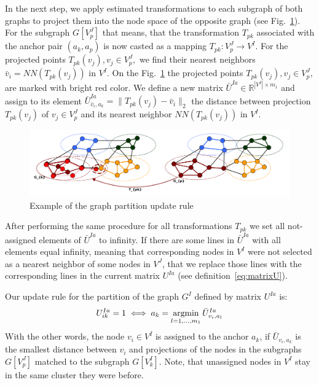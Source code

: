 In the next step, we apply estimated transformations to each subgraph of both graphs to project them into the node space of the opposite graph (see Fig.~\ref{fig:update}). For the subgraph $G[V^J_p]$ that means, that the transformation $T_{pk}$ associated with the anchor pair $(a_k,a_p)$ is now casted as a mapping $T_{pk}:V^J_p\rightarrow V^I$. For the projected points $T_{pk}(v_j),v_j\in V^J_p,$ we find their nearest neighbors $\bar{v}_i=NN(T_{pk}(v_j))$ in $V^I$. On the Fig.~\ref{fig:update} the projected points $T_{pk}(v_j),v_j\in V^J_p,$ are marked with bright red color. We define a new matrix $\bar{U}^{Ia}\in\mathbb{R}^{|V^I|\times m_1}$ and assign to its element $\bar{U}^{Ia}_{\bar{v}_i,a_k}=\|T_{pk}(v_j)-\bar{v}_i\|_2$ the distance between projection $T_{pk}(v_j)$ of $v_j\in V^J_p$ and its nearest neighbor $NN(T_{pk}(v_j))$ in $V^I$.

\begin{figure}[h]
	\centering
	\includegraphics[scale=0.35]{chapter2/fig/update.pdf}
	\caption{Example of the graph partition update rule} \label{fig:update}
\end{figure}

After performing the same procedure for all transformations $T_{pk}$ we set all not-assigned elements of $\bar{U}^{Ia}$ to infinity. If there are some lines in $\bar{U}^{Ia}$ with all elements equal infinity, meaning that corresponding nodes in $V^I$ were not selected as a nearest neighbor of some nodes in $V^J$,
that we replace those lines with the corresponding lines in the current matrix $U^{Ia}$ (see definition~\eqref{eq:matrixU}).

Our update rule for the partition of the graph $G^I$ defined by matrix $U^{Ia}$ is:
\begin{equation}
U^{Ia}_{ik}=1 \iff a_k=\mathop{\rm argmin}_{l=1,\dots,m_1}^{}{\bar{U}^{Ia}_{v_i,a_l}}
\end{equation}
With the other words, the node $v_i\in V^I$ is assigned to the anchor $a_k$, if $\bar{U}_{v_i,a_k}$ is the smallest distance between $v_i$ and projections of the nodes in the subgraphs $G[V^J_p]$ matched to the subgraph $G[V^I_k]$. Note, that unassigned nodes in $V^I$ stay in the same cluster they were before.

